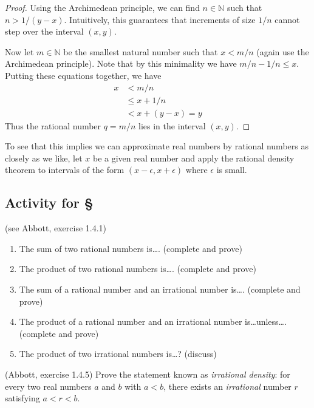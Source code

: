 \documentclass[11pt,oneside]{amsbook}
\newcommand{\N}{\mathbb N}
\theoremstyle{definition}
\theoremstyle{plain}
\theoremstyle{definition}
\theoremstyle{remark}
\numberwithin{equation}{section}
\numberwithin{figure}{section}
\newcounter{activityitem}
\newenvironment{activity}{\begin{list}{\arabic{activityitem}.}{\usecounter{activityitem}\setlength{\itemsep}{.2in}}}{\end{list}}
\begin{document}
\begin{proof}
  Using the Archimedean principle, we can find $n\in\N$ such that $n>1/(y-x)$. Intuitively, this guarantees that increments of size $1/n$ cannot step over the interval $(x,y)$.

  Now let $m\in\N$ be the smallest natural number such that $x<m/n$ (again use the Archimedean principle). Note that by this minimality we have $m/n-1/n\leq x$. Putting these equations together, we have
\begin{align*}
  x&<m/n\\
   &\leq x+1/n\\
   &<x+(y-x)=y
\end{align*}
Thus the rational number $q=m/n$ lies in the interval $(x,y)$.
\end{proof}

To see that this implies we can approximate real numbers by rational numbers as closely as we like, let $x$ be a given real number and apply the rational density theorem to intervals of the form $(x-\epsilon,x+\epsilon)$ where $\epsilon$ is small.

\newpage
\subsection*{Activity for \S\thesection}

\begin{activity}
  \item (see Abbott, exercise 1.4.1)
  \begin{enumerate}
    \item The sum of two rational numbers is\ldots. (complete and prove)
    \item The product of two rational numbers is\ldots. (complete and prove)
    \item The sum of a rational number and an irrational number is\ldots. (complete and prove)
    \item The product of a rational number and an irrational number is\ldots unless\ldots. (complete and prove)
    \item The product of two irrational numbers is\ldots? (discuss)
  \end{enumerate}
  \item (Abbott, exercise 1.4.5) Prove the statement known as \emph{irrational density}: for every two real numbers $a$ and $b$ with $a<b$, there exists an \emph{irrational} number $r$ satisfying $a<r<b$.
\end{activity}
\end{document}
